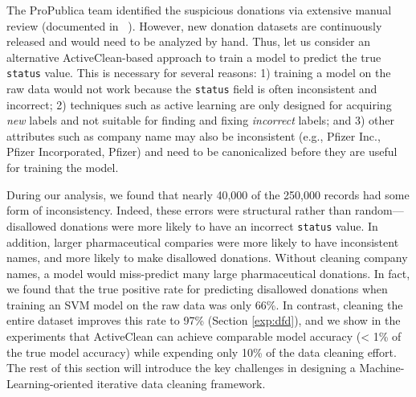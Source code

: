 
The ProPublica team identified the suspicious donations via extensive manual review (documented in ~\cite{dollarsfordocs}).
However, new donation datasets are continuously released and would need to be analyzed by hand.
Thus, let us consider an alternative ActiveClean-based approach to train a model to predict the true \texttt{status} value.
This is necessary for several reasons: 1) training a model on the raw data would not work because the \texttt{status} field is often inconsistent and incorrect;
2) techniques such as active learning are only designed for acquiring {\it new} labels and not suitable for finding and fixing {\it incorrect} labels;
and 3) other attributes such as company name may also be inconsistent (e.g., Pfizer Inc., Pfizer Incorporated, Pfizer) and need to be canonicalized before they are useful
for training the model.

During our analysis, we found that nearly 40,000 of the 250,000 records had some form of inconsistency.
Indeed, these errors were structural rather than random---disallowed donations were more likely to have an incorrect \texttt{status} value.
In addition, larger pharmaceutical comparies were more likely to have inconsistent names, and more likely to make disallowed donations.
Without cleaning company names, a model would miss-predict many large pharmaceutical donations.
In fact, we found that the true positive rate for predicting disallowed donations when training an SVM model on the raw data was only 66\%.
In contrast, cleaning the entire dataset improves this rate to 97\% (Section \ref{exp:dfd}), and we show in the experiments that ActiveClean
can achieve comparable model accuracy (< 1\% of the true model accuracy) while expending only 10\% of the data cleaning effort.
The rest of this section will introduce the key challenges in designing a Machine-Learning-oriented iterative data cleaning framework.




